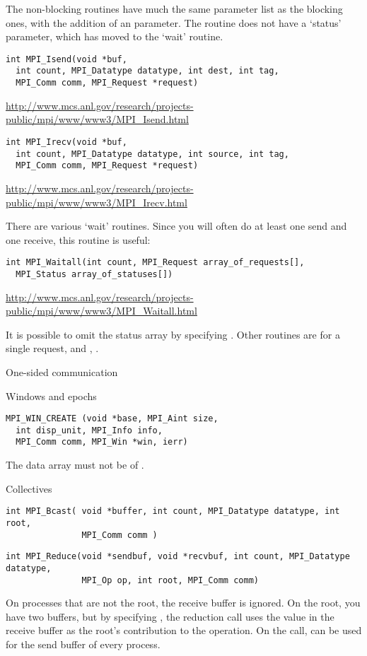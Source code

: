 The non-blocking routines have much the same parameter list as the 
blocking ones, with the addition of an  parameter.
The  routine does not have a `status' parameter,
which has moved to the `wait' routine.
\begin{verbatim}
int MPI_Isend(void *buf,
  int count, MPI_Datatype datatype, int dest, int tag,
  MPI_Comm comm, MPI_Request *request)
\end{verbatim}
\url{http://www.mcs.anl.gov/research/projects-public/mpi/www/www3/MPI_Isend.html}
\begin{verbatim}
int MPI_Irecv(void *buf,
  int count, MPI_Datatype datatype, int source, int tag,
  MPI_Comm comm, MPI_Request *request)
\end{verbatim}
\url{http://www.mcs.anl.gov/research/projects-public/mpi/www/www3/MPI_Irecv.html}

There are various `wait' routines. Since you will often do at least
one send and one receive, this routine is useful:
\begin{verbatim}
int MPI_Waitall(int count, MPI_Request array_of_requests[], 
  MPI_Status array_of_statuses[])
\end{verbatim}
\url{http://www.mcs.anl.gov/research/projects-public/mpi/www/www3/MPI_Waitall.html}

It is possible to omit the status array by specifying .
Other routines are  for a single request, and
, .

 {One-sided communication}

 {Windows and epochs}

\begin{verbatim}
MPI_WIN_CREATE (void *base, MPI_Aint size, 
  int disp_unit, MPI_Info info, 
  MPI_Comm comm, MPI_Win *win, ierr)
\end{verbatim}
The data array must not be  of .

 {Collectives}

\begin{verbatim}
int MPI_Bcast( void *buffer, int count, MPI_Datatype datatype, int root, 
               MPI_Comm comm )
\end{verbatim}

\begin{verbatim}
int MPI_Reduce(void *sendbuf, void *recvbuf, int count, MPI_Datatype datatype, 
               MPI_Op op, int root, MPI_Comm comm)
\end{verbatim}
On processes that are not the root, the receive buffer is ignored. On the root, 
you have two buffers, but by specifying , the reduction call
uses the value in the receive buffer as the root's contribution to the operation.
On the  call,  can be used for the send buffer of
every process.

